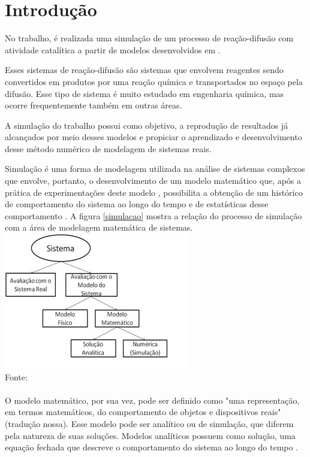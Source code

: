 
\section{Introdução}

No trabalho, é realizada uma simulação de um processo de reação-difusão com
atividade catalítica a partir de modelos desenvolvidos em \cite{3}.

Esses sistemas de reação-difusão são sistemas que envolvem reagentes sendo
convertidos em produtos por uma reação química e transportados no espaço pela
difusão. Esse tipo de sistema é muito estudado em engenharia química, mas ocorre
frequentemente também em outras áreas. \cite{4}

A simulação do trabalho possui como objetivo, a reprodução de resultados já
alcançados por meio desses modelos e propiciar o aprendizado e desenvolvimento
desse método numérico de modelagem de sistemas reais.

Simulação é uma forma de modelagem utilizada na análise de sistemas complexos
que envolve, portanto, o desenvolvimento de um modelo matemático que, após a
prática de experimentações deste modelo , possibilita a obtenção de um histórico
de comportamento do sistema ao longo do tempo e de estatísticas desse
comportamento \cite{1}. A figura \ref{simulacao} mostra a relação do processo de
simulação com a área de modelagem matemática de sistemas.\\


{ \centering
	\captionsetup{type=figure}
	\includegraphics[width=\columnwidth]{./figures/011-Simulacao.jpg}\\
	Fonte: \cite{1}\\\hspace{\columnwidth}\\
	\label{simulacao}
}
O modelo matemático, por sua vez, pode ser definido como "uma representação, em
termos matemáticos, do comportamento de objetos e dispositivos reais" \cite{2}
(tradução nossa). Esse modelo pode ser analítico ou de simulação, que diferem
pela natureza de suas soluções. Modelos analíticos possuem como solução, uma
equação fechada que descreve o comportamento do sistema ao longo do tempo
\cite{1}.

